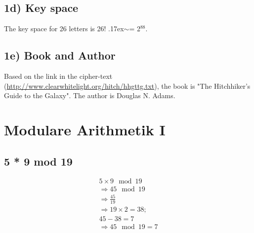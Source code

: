 \subsection{1d) Key space}
\label{section:1d}
\begin{comment}
What is the key space of this substitution cipher, with an alphabet consisting of 26 letters?
\end{comment}
The key space for 26 letters is 26! {\raise.17ex\hbox{$\scriptstyle\sim$}}= 2$^{88}$.

\subsection{1e) Book and Author}
\label{section:1e}
Based on the link in the cipher-text (\url{http://www.clearwhitelight.org/hitch/hhgttg.txt}), the book is "The Hitchhiker's Guide to the Galaxy".
The author is Douglas N. Adams.

\section{Modulare Arithmetik I}
\label{section:mod_arithmetik1}

\subsection{5 * 9 mod 19}
\label{section:2a}
\begin{equation}
	\begin{split}
		5 \times 9 \mod 19 \\
		\Rightarrow 45 \mod 19 \\
		\Rightarrow \frac{45}{19} \\
		\Rightarrow 19 \times 2 = 38; \\
		45 - 38 = 7 \\
		\Rightarrow 45 \mod 19 = 7 
	\end{split}
\end{equation}

